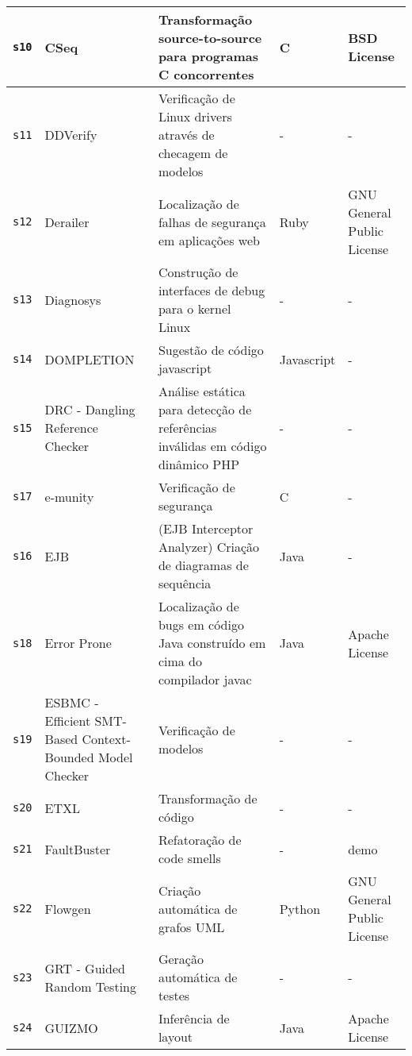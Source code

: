 \begin{longtable}{| l | p{4.5cm} | p{7cm} | p{1.5cm} | p{3cm} |}
    \hline
    \texttt{s10} &
      CSeq &
      Transformação source-to-source para programas C concorrentes &
      C &
      BSD License \\
    \hline
    \texttt{s11} &
      DDVerify &
      Verificação de Linux drivers através de checagem de modelos &
      - &
      - \\
    \hline
    \texttt{s12} &
      Derailer &
      Localização de falhas de segurança em aplicações web &
      Ruby &
      GNU General Public License \\
    \hline
    \texttt{s13} &
      Diagnosys &
      Construção de interfaces de debug para o kernel Linux &
      - &
      - \\
    \hline
    \texttt{s14} &
      DOMPLETION &
      Sugestão de código javascript &
      Javascript &
      - \\
    \hline
    \texttt{s15} &
      DRC - Dangling Reference Checker &
      Análise estática para detecção de referências inválidas em código dinâmico PHP &
      - &
      - \\
    \hline
    \texttt{s17} &
      e-munity &
      Verificação de segurança &
      C &
      - \\
    \hline
    \texttt{s16} &
      EJB &
      (EJB Interceptor Analyzer) Criação de diagramas de sequência &
      Java &
      - \\
    \hline
    \texttt{s18} &
      Error Prone &
      Localização de bugs em código Java construído em cima do compilador javac &
      Java &
      Apache License \\
    \hline
    \texttt{s19} &
      ESBMC - Efficient SMT-Based Context-Bounded Model Checker &
      Verificação de modelos &
      - &
      - \\
    \hline
    \texttt{s20} &
      ETXL &
      Transformação de código &
      - &
      - \\
    \hline
    \texttt{s21} &
      FaultBuster &
      Refatoração de code smells &
      - &
      demo \\
    \hline
    \texttt{s22} &
      Flowgen &
      Criação automática de grafos UML &
      Python &
      GNU General Public License \\
    \hline
    \texttt{s23} &
      GRT - Guided Random Testing &
      Geração automática de testes &
      - &
      - \\
    \hline
    \texttt{s24} &
      GUIZMO &
      Inferência de layout &
      Java &
      Apache License \\
    \hline

\end{longtable}
